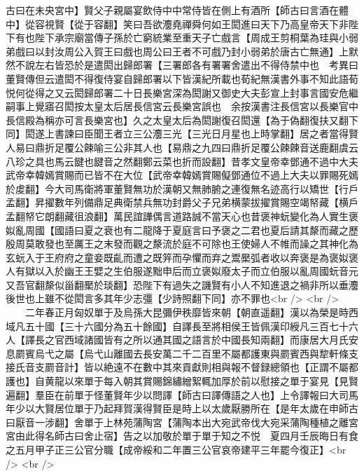古曰在未央宮中】賢父子親屬宴飲侍中中常侍皆在側上有酒所【師古曰言酒在體中】從容視賢【從于容翻】笑曰吾欲灋堯禪舜何如王閎進曰天下乃高皇帝天下非陛下有也陛下承宗廟當傳子孫於亡窮統業至重天子亡戲言【周成王剪桐葉為珪與小弱弟戲曰以封汝周公入賀王曰戲也周公曰王者不可戲乃封小弱弟於唐古亡無通】上默然不說左右皆恐於是遣閎出歸郎署【三署郎各有署署舍遣出不得侍禁中也　考異曰董賢傳但云遣閎不得復侍宴自歸郎署以下皆漢紀所載也荀紀無漢書外事不知此語荀悦何從得之又云閎歸郎署二十日長樂宮深為閎謝又御史大夫彭宣上封事言國安危繼嗣事上覺寤召閎按太皇太后居長信宮云長樂宮誤也　余按漢書注長信宮以長樂官中長信殿為稱亦可言長樂宮也】久之太皇太后為閎謝復召閎還【為于偽翻復扶又翻下同】閎遂上書諫曰臣聞王者立三公灋三光【三光日月星也上時掌翻】居之者當得賢人易曰鼎折足覆公餗喻三公非其人也【易鼎之九四曰鼎折足覆公餗餗音送鹿翻虞云八珍之具也馬云䭈也䭈音之然翻鄭云菜也折而設翻】昔孝文皇帝幸鄧通不過中大夫武帝幸韓嫣賞賜而已皆不在大位【武帝幸韓嫣賞賜儗鄧通位不過上大夫以罪賜死嫣於䖍翻】今大司馬衛將軍董賢無功於漢朝又無肺腑之連復無名迹高行以矯世【行戶孟翻】昇擢數年列備鼎足典衛禁兵無功封爵父子兄弟横蒙拔擢賞賜空竭帑藏【横戶孟翻帑它朗翻藏徂浪翻】萬民誼譁偶言道路誠不當天心也昔褒神蚖變化為人實生褒姒亂周國【國語曰夏之衰也有二龍降于夏庭言曰予褒之二君也夏后請其漦而藏之歷殷周莫敢發也至厲王之末發而觀之漦流於庭不可除也王使婦人不帷而譟之其神化為玄蚖入于王府府之童妾既齓而遭之既笄而孕懼而弃之鬻檿弧者收以奔褒是為褒姒褒人有獄以入於幽王王嬖之生伯服遂黜申后而立褒姒廢太子而立伯服以亂周國蚖音元又吾官翻漦似甾翻檿於琰翻】恐陛下有過失之譏賢有小人不知進退之禍非所以垂灋後世也上雖不從閎言多其年少志彊【少詩照翻下同】亦不罪也<br />
<br />
　　二年春正月匈奴單于及烏孫大昆彌伊秩靡皆來朝【朝直遥翻】漢以為榮是時西域凡五十國【三十六國分為五十餘國】自譯長至將相侯王皆佩漢印綬凡三百七十六人【譯長之官西域諸國皆有之所以通其國之語言於中國長知兩翻】而康居大月氏安息罽賓烏弋之屬【烏弋山離國去長安萬二千二百里不屬都護東與罽賓西與犂軒條支接氏音支罽音計】皆以絶遠不在數中其來貢獻則相與報不督録總領也【正謂不屬都護也】自黄龍以來單于每入朝其賞賜錦繡繒絮輒加厚於前以慰接之單于宴見【見賢遍翻】羣臣在前單于怪董賢年少以問譯【師古曰譯傳語之人也】上令譯報曰大司馬年少以大賢居位單于乃起拜賀漢得賢臣是時上以太歲厭勝所在【是年太歲在申師古曰厭音一涉翻】舍單于上林苑蒲陶宮【蒲陶本出大宛武帝伐大宛采蒲陶種植之離宮宮由此得名師古曰舍止宿】告之以加敬於單于單于知之不悦　夏四月壬辰晦日有食之五月甲子正三公官分職【成帝綏和二年置三公官哀帝建平三年罷今復正】<br />
<br />
